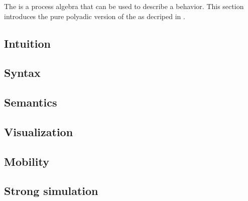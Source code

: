 The \findex[\picalc{}|(]{\picalc{}} is a process algebra that can be used to describe a behavior. This section introduces the pure polyadic version of the \picalc{} as decriped in \cite{milner}. 


\subsection{Intuition}
\label{sec_pi_intuition}


\subsection{Syntax}
\label{sec_pi_syntax}


\subsection{Semantics}
\label{sec_pi_sem}


\subsection{Visualization}
\label{sec_pi_visualization}


\subsection{Mobility}
\label{sec_pi_mobility}


\subsection{Strong simulation}
\label{sec_pi_simulation}


\newpage %
